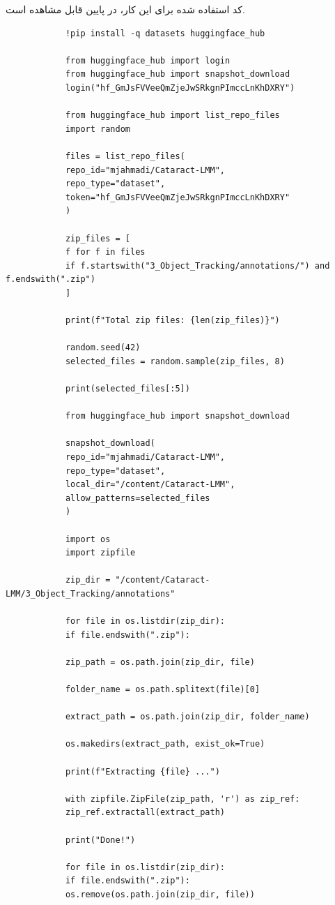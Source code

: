 \documentclass{article}
\begin{document}
کد استفاده شده برای این کار، در پایین قابل مشاهده است.
\begin{latin}
	\begin{LTR}
		\begin{verbatim}
			!pip install -q datasets huggingface_hub
			
			from huggingface_hub import login
			from huggingface_hub import snapshot_download
			login("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")
			
			from huggingface_hub import list_repo_files
			import random
			
			files = list_repo_files(
			repo_id="mjahmadi/Cataract-LMM",
			repo_type="dataset",
			token="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"
			)
			
			zip_files = [
			f for f in files
			if f.startswith("3_Object_Tracking/annotations/") and f.endswith(".zip")
			]
			
			print(f"Total zip files: {len(zip_files)}")
			
			random.seed(42)
			selected_files = random.sample(zip_files, 8)
			
			print(selected_files[:5])
			
			from huggingface_hub import snapshot_download
			
			snapshot_download(
			repo_id="mjahmadi/Cataract-LMM",
			repo_type="dataset",
			local_dir="/content/Cataract-LMM",
			allow_patterns=selected_files
			)
			
			import os
			import zipfile
			
			zip_dir = "/content/Cataract-LMM/3_Object_Tracking/annotations"
			
			for file in os.listdir(zip_dir):
			if file.endswith(".zip"):
			
			zip_path = os.path.join(zip_dir, file)
			
			folder_name = os.path.splitext(file)[0]
			
			extract_path = os.path.join(zip_dir, folder_name)
			
			os.makedirs(extract_path, exist_ok=True)
			
			print(f"Extracting {file} ...")
			
			with zipfile.ZipFile(zip_path, 'r') as zip_ref:
			zip_ref.extractall(extract_path)
			
			print("Done!")
			
			for file in os.listdir(zip_dir):
			if file.endswith(".zip"):
			os.remove(os.path.join(zip_dir, file))
			

\end{verbatim}
\end{LTR}
\end{latin}
\end{document}
